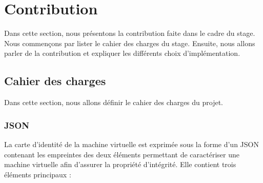 \newpage
\section{Contribution}
Dans cette section, nous présentons la contribution faite dans le cadre du stage.
Nous commençons par lister le cahier des charges du stage.
Ensuite, nous allons parler de la contribution et expliquer les différents choix d'implémentation.


\subsection{Cahier des charges}
Dans cette section, nous allons définir le cahier des charges du projet.

\subsubsection{JSON}
La carte d’identité de la machine virtuelle est exprimée sous la forme d’un JSON contenant les empreintes des deux éléments permettant de caractériser une machine virtuelle afin d’assurer la propriété d’intégrité.\cite{cdc}
Elle contient trois éléments principaux :
